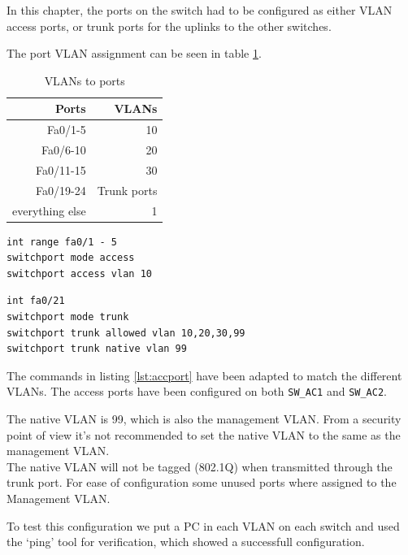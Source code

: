 In this chapter, the ports on the switch had to be configured as either VLAN access ports, or trunk ports for the uplinks to the other switches.

The port VLAN assignment can be seen in table \ref{tab:vlan_ports}.

\begin{table}[h]
\centering
\begin{tabular}{r||r}
\textbf{Ports} & \textbf{VLANs}  \\

		\hline
Fa0/1-5 & 10 \\
Fa0/6-10 & 20 \\
Fa0/11-15 & 30    \\
Fa0/19-24 & Trunk ports  \\
everything else & 1

\end{tabular}
\caption{VLANs to ports}
\label{tab:vlan_ports}
\end{table}

\begin{lstlisting}[caption={Access port configuration},label={lst:accport},language={}]
int range fa0/1 - 5
switchport mode access
switchport access vlan 10
\end{lstlisting}

\begin{lstlisting}[caption={Trunk port configuration},label={lst:accport},language={}]
int fa0/21
switchport mode trunk
switchport trunk allowed vlan 10,20,30,99
switchport trunk native vlan 99
\end{lstlisting}

The commands in listing \ref{lst:accport} have been adapted to match the different VLANs.
The access ports have been configured on both \texttt{SW\_AC1} and \texttt{SW\_AC2}.

The native VLAN is 99, which is also the management VLAN. From a security point of view it's not recommended to set the native VLAN to the same as the management VLAN. \\ 
The native VLAN will not be tagged (802.1Q) when transmitted through the trunk port. For ease of configuration some unused ports where assigned to the Management VLAN.

To test this configuration we put a PC in each VLAN on each switch and used the `ping' tool for verification, which showed a successfull configuration.

